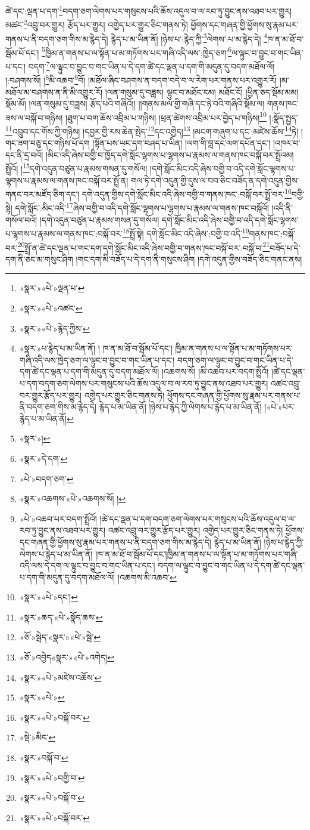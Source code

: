 ཚེ་དང་:ལྡན་པ་དག་\footnote{«སྣར་»«པེ་»ལྡན་པ་}བདག་ཅག་ལེགས་པར་གསུངས་པའི་ཆོས་འདུལ་བ་ལ་རབ་ཏུ་བྱུང་ནས་འཐབ་པར་གྱུར། མཚང་\footnote{«སྣར་»«པེ་»འཚང་}འབྲུ་བར་གྱུར། རྩོད་པར་གྱུར། འགྱེད་པར་གྱུར་ཅིང་གནས་ཏེ། ཕྱོགས་དང་གཞན་གྱི་ཕྱོགས་སུ་རྣམ་པར་གནས་པ་ནི་བདག་ཅག་གིས་མ་རྙེད་དེ། རྙེད་པ་མ་ཡིན་ནོ། །ཉེས་པ་:རྙེད་ཀྱི་\footnote{«སྣར་»«པེ་»རྙེད་ཀྱིས་}ལེགས་:པ་མ་རྙེད་དེ། \footnote{«སྣར་»པ་རྙེད་པ་མ་ཡིན་ནོ། ། ཁ་ན་མ་ཐོ་བ་སྦོམ་པོ་དང་། ཁྱིམ་ན་གནས་པ་ལ་སྟོན་པ་མ་གཏོགས་པར་གཞི་འདི་ལས་ཁྱེད་ཅག་ལ་ལྟུང་བ་བྱུང་བ་གང་ཡིན་པ་དང་། བདག་ཅག་ལ་ལྟུང་བ་བྱུང་བ་གང་ཡིན་པ་དེ་དག་ཚེ་དང་ལྡན་པ་དག་གི་མདུན་དུ་བདག་མཐོལ་ལོ། །འཆགས་སོ། །མི་འཆབ་པར་བདག་སྤྲོའོ། །ཚེ་དང་ལྡན་པ་དག་བདག་ཅག་ལེགས་པར་གསུངས་པའི་ཆོས་འདུལ་བ་ལ་རབ་ཏུ་བྱུང་ནས་འཐབ་པར་གྱུར། འཚང་འབྲུ་བར་གྱུར་རྩོད་པར་གྱུར། འགྱེད་པར་གྱུར་ཅིང་གནས་ཏེ། ཕྱོགས་དང་གཞན་གྱི་ཕྱོགས་སུ་རྣམ་པར་གནས་པ་ནི་བདག་ཅག་གིས་མ་རྙེད་དེ། རྙེད་པ་མ་ཡིན་ནོ། །ཉེས་པ་རྙེད་ཀྱི་ལེགས་པ་རྙེད་པ་མ་ཡིན་ནོ། །«པེ་»པར་རྙེད་པ་མ་ཡིན་ནོ། }ཁ་ན་མ་ཐོ་བ་སྦོམ་པོ་དང་། \footnote{«སྣར་»།}ཁྱིམ་ན་གནས་པ་ལ་སྟོན་པ་མ་གཏོགས་པར་གཞི་འདི་ལས་:ཁྱེད་ཅག་\footnote{«སྣར་»དེ་དག་}ལ་ལྟུང་བ་བྱུང་བ་གང་ཡིན་པ་དང་། བདག་\footnote{«པེ་»བདག་ཅག་}ལ་ལྟུང་བ་བྱུང་བ་གང་ཡིན་པ་དེ་དག་ཚེ་དང་ལྡན་པ་དག་གི་མདུན་དུ་བདག་མཐོལ་ལོ། །:བཤགས་སོ། །\footnote{«སྣར་»འཆགས་«པེ་»འཆགས་སོ། །}མི་འཆབ་\footnote{«པེ་»འཆབ་པར་བདག་སྤྲོའོ། །ཚེ་དང་ལྡན་པ་དག་བདག་ཅག་ལེགས་པར་གསུངས་པའི་ཆོས་འདུལ་བ་ལ་རབ་ཏུ་བྱུང་ནས་འཐབ་པར་གྱུར། འཚང་འབྲུ་བར་གྱུར་རྩོད་པར་གྱུར། འགྱེད་པར་གྱུར་ཅིང་གནས་ཏེ། ཕྱོགས་དང་གཞན་གྱི་ཕྱོགས་སུ་རྣམ་པར་གནས་པ་ནི་བདག་ཅག་གིས་མ་རྙེད་དེ། རྙེད་པ་མ་ཡིན་ནོ། །ཉེས་པ་རྙེད་ཀྱི་ལེགས་པ་རྙེད་པ་མ་ཡིན་ནོ། །ཁ་ན་མ་ཐོ་བ་སྦོམ་པོ་དང་།ཁྱིམ་ན་གནས་པ་ལ་སྟོན་པ་མ་གཏོགས་པར་གཞི་འདི་ལས་དེ་དག་ལ་ལྟུང་བ་བྱུང་བ་གང་ཡིན་པ་དང་། བདག་ལ་ལྟུང་བ་བྱུང་བ་གང་ཡིན་པ་དེ་དག་ཚེ་དང་ལྡན་པ་དག་གི་མདུན་དུ་བདག་མཐོལ་ལོ། །འཆགས་མི་འཆབ་}བོ། །མཐོལ་ཞིང་བཤགས་ན་བདག་བདེ་བ་ལ་རེག་པར་གནས་པར་འགྱུར་རོ། །མ་མཐོལ་མ་བཤགས་ན་ནི་མི་འགྱུར་རོ། །ལན་གསུམ་དུ་བཟླས། ལྟུང་བ་མཐོང་ངམ། མཐོང་ངོ། །ཕྱིན་ཅད་སྡོམ་མམ། སྡོམ་མོ། །ལན་གསུམ་དུ་བཟླས། རྩོད་པའི་གཞིའོ།། །།གནས་མལ་གྱི་གཞི་དང་ཉེ་བའི་གཞིའི་སྡོམ་ལ། གནས་ཁང་ཟས་ལ་བསྐོ་བ་གཉིས། །ཐུག་པ་བག་ཆོས་འབྲིམ་པ་གཉིས། །ཕྲན་ཚེགས་འབྲིམ་པར་བྱེད་པ་གཉིས།\footnote{«སྣར་»«པེ་»དང་།} །:སྣོད་སྤྱད་\footnote{«སྣར་»ཆད་«པེ་»སྣོད་ཆས་}འབྲུབ་དང་གོས་ཀྱི་གཉིས། །དབྱར་གྱི་རས་ཆེན་སྤེད་\footnote{«ཅོ་»སྦེད་«སྣར་»«པེ་»སྦེ་}དང་འགྱེད།\footnote{«ཅོ་»འབྱེད«སྣར་»«པེ་»འགེད།} །མངག་གཞུག་པ་དང་:མཛེས་ཆོས་\footnote{«སྣར་»«པེ་»མཛེས་འཆོས་}ཏེ། །གང་ཟག་བཅུ་དང་གཉིས་པོ་དག །སྟོན་པས་ཡང་དག་བཤད་པ་ཡིན། །ལག་གི་བླ་དང་ལག་དཔོན་དང་། །འཁར་བ་དང་ནི་དྲ་བའོ། །མིང་འདི་ཞེས་བགྱི་བ་ཁྱོད་དགེ་སློང་ལྷགས་པ་ལྷགས་པ་རྣམས་ལ་གནས་ཁང་བསྐོ་བར་སྤྲོའམ། སྤྲོའོ། །\footnote{«སྣར་»«པེ་»}དགེ་འདུན་བཙུན་པ་རྣམས་གསན་དུ་གསོལ། །དགེ་སློང་མིང་འདི་ཞེས་བགྱི་བ་འདི་དགེ་སློང་ལྷགས་པ་ལྷགས་པ་རྣམས་ལ་གནས་ཁང་བསྐོ་བར་སྤྲོ་ན། གལ་ཏེ་དགེ་འདུན་གྱི་དུས་ལ་བབ་ཅིང་བཟོད་ན་དགེ་འདུན་གྱིས་གནང་བར་མཛོད་ཅིག་དང་། དགེ་འདུན་གྱིས་དགེ་སློང་མིང་འདི་ཞེས་བགྱི་བ་གནས་ཁང་:བསྐོ་བར་སྤྲོ་བར་\footnote{«སྣར་»«པེ་»བསྐོ་བར་}བགྱི་སྟེ། དགེ་སློང་:མིང་འདི་\footnote{«སྡེ་»མིང་}ཞེས་བགྱི་བ་འདི་དགེ་སློང་ལྷགས་པ་ལྷགས་པ་རྣམས་ལ་གནས་ཁང་བསྐོའོ། །འདི་ནི་གསོལ་བའོ། །དགེ་འདུན་བཙུན་པ་རྣམས་གསན་དུ་གསོལ། དགེ་སློང་མིང་འདི་ཞེས་བགྱི་བ་འདི་དགེ་སློང་ལྷགས་པ་ལྷགས་པ་རྣམས་ལ་གནས་ཁང་:བསྐོ་བར་\footnote{«སྣར་»བསྐོ་བ་}སྤྲོ་སྟེ། དགེ་སློང་མིང་འདི་ཞེས་:བགྱི་བ་འདི་\footnote{«སྣར་»«པེ་»བགྱི་བ་}གནས་ཁང་:བསྐོ་བར་\footnote{«སྣར་»«པེ་»བསྐོ་བ་}སྤྲོ་ན་ཚེ་དང་ལྡན་པ་གང་དག་དགེ་སློང་མིང་འདི་ཞེས་བགྱི་བ་གནས་ཁང་བསྐོ་བར་:བསྐོ་བ་\footnote{«སྣར་»«པེ་»བསྐོ་བར་}བཟོད་པ་དེ་དག་ནི་ཅང་མ་གསུང་ཤིག །གང་དག་མི་བཟོད་པ་དེ་དག་ནི་གསུངས་ཤིག །དགེ་འདུན་གྱིས་བཟོད་ཅིང་གནང་ནས། 